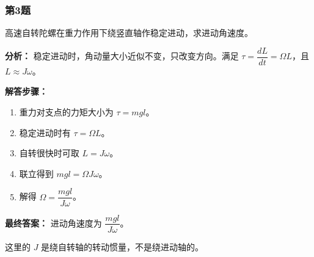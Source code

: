 \documentclass[12pt,a4paper]{ctexart}
\begin{document}
\subsubsection*{第3题}
\begin{tcolorbox}[colback=gray!2!white,colframe=black!60,title={题目}]
高速自转陀螺在重力作用下绕竖直轴作稳定进动，求进动角速度。\par
\end{tcolorbox}
\begin{tcolorbox}[colback=blue!2!white,colframe=blue!55!black,title={完整答案}]
\textbf{分析：}
稳定进动时，角动量大小近似不变，只改变方向。满足 \(\tau=\dfrac{dL}{dt}=\Omega L\)，且 \(L\approx J\omega\)。\par
\textbf{解答步骤：}
\begin{enumerate}
\item 重力对支点的力矩大小为 \(\tau=mgl\)。
\item 稳定进动时有 \(\tau=\Omega L\)。
\item 自转很快时可取 \(L=J\omega\)。
\item 联立得到 \(mgl=\Omega J\omega\)。
\item 解得 \(\Omega=\dfrac{mgl}{J\omega}\)。
\end{enumerate}
\textbf{最终答案：}
进动角速度为 \(\dfrac{mgl}{J\omega}\)。\par
\end{tcolorbox}
\begin{tcolorbox}[colback=red!2!white,colframe=red!55!black,title={易错点}]
这里的 \(J\) 是绕自转轴的转动惯量，不是绕进动轴的。\par
\end{tcolorbox}
\end{document}
